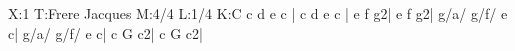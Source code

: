 X:1
T:Frere Jacques
M:4/4
L:1/4
K:C
c d e c      | c d e c      | e f g2| e f g2|
g/a/ g/f/ e c| g/a/ g/f/ e c| c G c2| c G c2|
